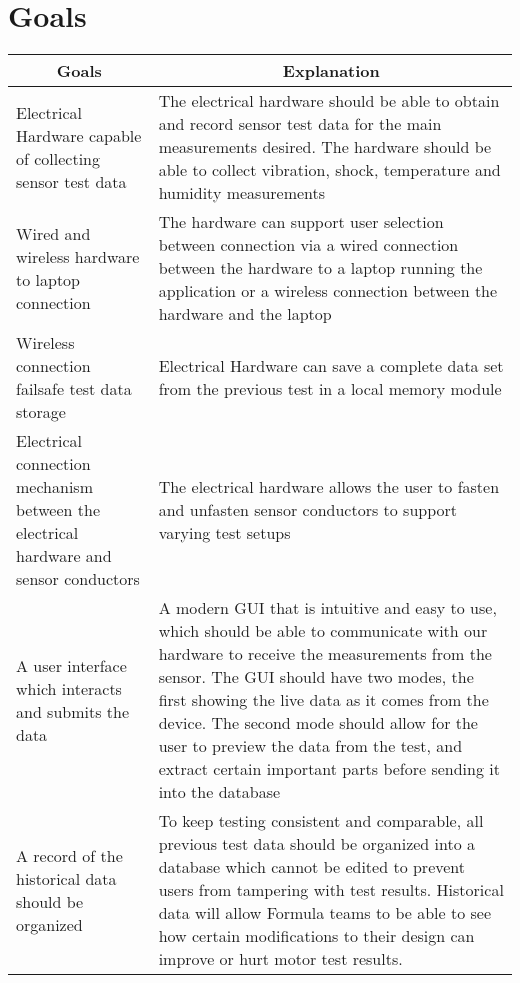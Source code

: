 \documentclass[12pt]{article}
\begin{document}
\section{Goals}
    \begin{longtable}{|p{6cm}|p{10cm}|}
    \hline
    \multicolumn{1}{|c|}{\textbf{Goals}} & \multicolumn{1}{c|}{\textbf{Explanation}} 
    \\ \hline
    Electrical Hardware capable of collecting sensor test data
    & The electrical hardware should be able to obtain and record sensor test data for the main measurements desired. The hardware should be able to collect vibration, shock, temperature and humidity measurements
    \newline                                
    \\ \hline
    Wired and wireless hardware to laptop connection
    & The hardware can support user selection between connection via a wired connection between the hardware to a laptop running the application or a wireless connection between the hardware and the laptop
    \newline                                
    \\ \hline
    Wireless connection failsafe test data storage
    & Electrical Hardware can save a complete data set from the previous test in a local memory module
    \newline                                
    \\ \hline
    Electrical connection mechanism between the electrical hardware and sensor conductors
    & The electrical hardware allows the user to fasten and unfasten sensor conductors to support varying test setups
    \newline                                
    \\ \hline
    A user interface which interacts and submits the data                                 
    & A modern GUI that is intuitive and easy to use, which should be able to communicate with our hardware to receive the measurements from the sensor. The GUI should have two modes, the first showing the live data as it comes from the device. The second mode should allow for the user to preview the data from the test, and extract certain important parts before sending it into the database  
    \newline                                
    \\ \hline
    A record of the historical data should be organized                                
    & To keep testing consistent and comparable, all previous test data should be organized into a database which cannot be edited to prevent users from tampering with test results. Historical data will allow Formula teams to be able to see how certain modifications to their design can improve or hurt motor test results. 

\end{longtable}
\end{document}

